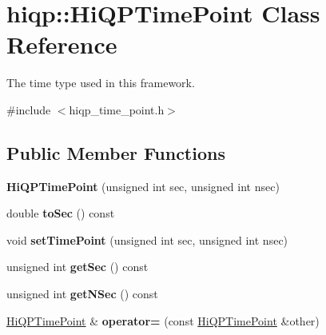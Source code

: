 \hypertarget{classhiqp_1_1HiQPTimePoint}{\section{hiqp\-:\-:Hi\-Q\-P\-Time\-Point Class Reference}
\label{classhiqp_1_1HiQPTimePoint}
}


The time type used in this framework.  




{\ttfamily \#include $<$hiqp\-\_\-time\-\_\-point.\-h$>$}

\subsection*{Public Member Functions}
\begin{DoxyCompactItemize}
\item 
\hypertarget{classhiqp_1_1HiQPTimePoint_ab782a12e0231f8690f1a1612734fa3a0}{{\bfseries Hi\-Q\-P\-Time\-Point} (unsigned int sec, unsigned int nsec)}\label{classhiqp_1_1HiQPTimePoint_ab782a12e0231f8690f1a1612734fa3a0}

\item 
\hypertarget{classhiqp_1_1HiQPTimePoint_a8483fab99bc1165128e5e7da7274368e}{double {\bfseries to\-Sec} () const }\label{classhiqp_1_1HiQPTimePoint_a8483fab99bc1165128e5e7da7274368e}

\item 
\hypertarget{classhiqp_1_1HiQPTimePoint_a1e2b0f0cbede66fdcff58a9accaaabf0}{void {\bfseries set\-Time\-Point} (unsigned int sec, unsigned int nsec)}\label{classhiqp_1_1HiQPTimePoint_a1e2b0f0cbede66fdcff58a9accaaabf0}

\item 
\hypertarget{classhiqp_1_1HiQPTimePoint_a3d8648ce24428c49e3fa5c9fd3e21c54}{unsigned int {\bfseries get\-Sec} () const }\label{classhiqp_1_1HiQPTimePoint_a3d8648ce24428c49e3fa5c9fd3e21c54}

\item 
\hypertarget{classhiqp_1_1HiQPTimePoint_a6505f34b808f1a1a8c0a5eea65d0f10e}{unsigned int {\bfseries get\-N\-Sec} () const }\label{classhiqp_1_1HiQPTimePoint_a6505f34b808f1a1a8c0a5eea65d0f10e}

\item 
\hypertarget{classhiqp_1_1HiQPTimePoint_a647e64067a25f8a1d981d304d94295e8}{\hyperlink{classhiqp_1_1HiQPTimePoint}{Hi\-Q\-P\-Time\-Point} \& {\bfseries operator=} (const \hyperlink{classhiqp_1_1HiQPTimePoint}{Hi\-Q\-P\-Time\-Point} \&other)}\label{classhiqp_1_1HiQPTimePoint_a647e64067a25f8a1d981d304d94295e8}


\end{DoxyCompactItemize}
